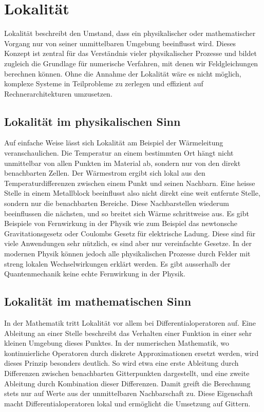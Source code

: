 %
%
%
%
\section{Lokalität
\label{parallelisierung:sec:Lokalitaet}}
Lokalität beschreibt den Umstand, dass ein physikalischer oder mathematischer Vorgang nur von seiner unmittelbaren Umgebung beeinflusst wird. 
%
Dieses Konzept ist zentral für das Verständnis vieler physikalischer Prozesse und bildet zugleich die Grundlage für numerische Verfahren, mit denen wir Feldgleichungen berechnen können. 
Ohne die Annahme der Lokalität wäre es nicht möglich, komplexe Systeme in Teilprobleme zu zerlegen und effizient auf Rechnerarchitekturen umzusetzen.

\subsection{Lokalität im physikalischen Sinn
	\label{parallelisierung:sub:LokalitaetPhysik}}
Auf einfache Weise lässt sich Lokalität am Beispiel der Wärmeleitung veranschaulichen. 
%
Die Temperatur an einem bestimmten Ort hängt nicht unmittelbar von allen Punkten im Material ab, sondern nur von den direkt benachbarten Zellen. 
Der Wärmestrom ergibt sich lokal aus den Temperaturdifferenzen zwischen einem Punkt und seinen Nachbarn.
Eine heisse Stelle in einem Metallblock beeinflusst also nicht direkt eine weit entfernte Stelle, sondern nur die benachbarten Bereiche. 
Diese Nachbarstellen wiederum beeinflussen die nächsten, und so breitet sich Wärme schrittweise aus. 
Es gibt Beispiele von Fernwirkung in der Physik wie zum Beispiel das newtonsche Gravitationsgesetz oder Coulombs Gesetz für elektrische Ladung.
Diese sind für viele Anwendungen sehr nützlich, es sind aber nur vereinfachte Gesetze.
In der modernen Physik können jedoch alle physikalischen Prozesse durch Felder mit streng lokalen Wechselwirkungen erklärt werden.
Es gibt ausserhalb der Quantenmechanik keine echte Fernwirkung in der Physik.

\subsection{Lokalität im mathematischen Sinn
\label{parallelisierung:sub:LokalitaetMathematik}}
In der Mathematik tritt Lokalität vor allem bei Differentialoperatoren auf. 
Eine Ableitung an einer Stelle beschreibt das Verhalten einer Funktion in einer sehr kleinen Umgebung dieses Punktes. 
In der numerischen Mathematik, wo kontinuierliche Operatoren durch diskrete Approximationen ersetzt werden, wird dieses Prinzip besonders deutlich. 
So wird etwa eine erste Ableitung durch Differenzen zwischen benachbarten Gitterpunkten dargestellt, und eine zweite Ableitung durch Kombination dieser Differenzen. 
Damit greift die Berechnung stets nur auf Werte aus der unmittelbaren Nachbarschaft zu. 
Diese Eigenschaft macht Differentialoperatoren lokal und ermöglicht die Umsetzung auf Gittern.

